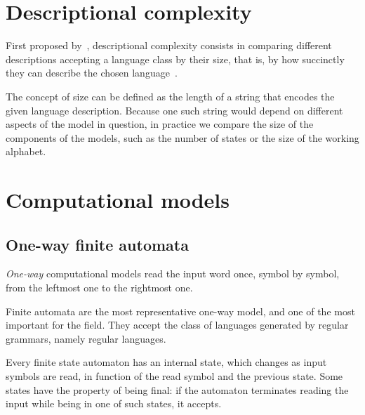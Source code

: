 \section{Descriptional complexity}
First proposed by~\citeauthor{MeyFis71}, descriptional complexity consists in comparing different descriptions accepting a language class by their size, that is, by how succinctly they can describe the chosen language~\cite{MeyFis71}.

The concept of size can be defined as the length of a string that encodes the given language description.
Because one such string would depend on different aspects of the model in question, in practice we compare the size of the components of the models, such as the number of states or the size of the working alphabet.



\section{Computational models}


\subsection{One-way finite automata}
\emph{One-way} computational models read the input word once, symbol by symbol, from the leftmost one to the rightmost one.

Finite automata are the most representative one-way model, and one of the most important for the field.
They accept the class of languages generated by regular grammars, namely regular languages.

Every finite state automaton has an internal state, which changes as input symbols are read, in function of the read symbol and the previous state.
Some states have the property of being final: if the automaton terminates reading the input while being in one of such states, it accepts.

